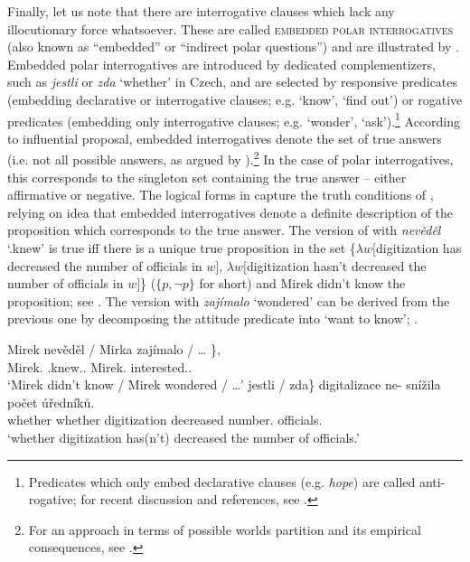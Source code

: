\documentclass[output=paper,colorlinks,citecolor=brown]{langscibook}
\begin{document}
\noindent Finally, let us note that there are interrogative clauses which lack any illocutionary force whatsoever. These are called \textsc{embedded polar interrogatives} (also known as ``embedded'' or ``indirect polar questions'') and are illustrated by . Embedded polar interrogatives are introduced by dedicated complementizers, such as \textit{jestli} or \textit{zda} `whether' in Czech, and are selected by responsive predicates (embedding declarative or interrogative clauses; e.g. `know', `find out') or rogative predicates (embedding only interrogative clauses; e.g. `wonder', `ask').\footnote{Predicates which only embed declarative clauses (e.g. \textit{hope}) are called anti-rogative; for recent discussion and references, see \citet{Theiler.etal2019,Uegaki.Sudo2019}.} According to  influential proposal, embedded interrogatives denote the set of true answers (i.e. not all possible answers, as argued by \citealt{Hamblin1973}).\footnote{For an approach in terms of possible worlds partition and its empirical consequences, see \citet{Groenendijk.Stokhof1984}.} In the case of polar interrogatives, this corresponds to the singleton set containing the true answer -- either affirmative or negative. The logical forms in  capture the truth conditions of , relying on  idea that embedded interrogatives denote a definite description of the proposition which corresponds to the true answer. The version of  with \textit{nevěděl} `{\NEG}.knew' is true iff there is a unique true proposition in the set \{$\lambda w[$digitization has decreased the number of officials in $w]$, $\lambda w[$digitization hasn't decreased the number of officials in $w]$\} ($\{p,\neg p\}$ for short) and Mirek didn't know the proposition; see . The version with \textit{zajímalo} `wondered' can be derived from the previous one by decomposing the attitude predicate into `want to know'; .

\ea\label{sim:ex:ei}\ea\gll\minsp{\{} Mirek nevěděl / Mirka zajímalo / {\dots} \},\\
{} Mirek.{\NOM} {\NEG}.knew.{\SG.\MASC} {} Mirek.{\ACC} interested.{\SG.\NEUT} {} {}\\
\glt `Mirek didn't know / Mirek wondered / \dots'
\ex\gll \minsp{\{} jestli / zda\} digitalizace \minsp{(} ne-\minsp{)} snížila počet úředníků.\label{sim:ex:ei1}\\
{} whether {} whether digitization {} {\NEG} decreased number.{\ACC} officials.{\GEN}\\
\glt `whether digitization has(n't) decreased the number of officials.'
\z\z
\end{document}

